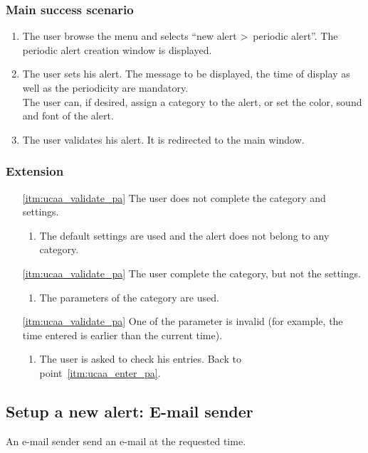 \subsubsection{Main success scenario}
\begin{enumerate}
	\item The user browse the menu and selects ``new alert \textgreater~periodic alert''. The periodic alert creation window is displayed. 
	\item\label{itm:ucaa_enter_pa} The user sets his alert. The message to be displayed, the time of display as well as the periodicity are mandatory. \\The user can, if desired, assign a category to the alert, or set the color, sound and font of the alert.
	\item\label{itm:ucaa_validate_pa} The user validates his alert. It is redirected to the main window.
\end{enumerate}
\subsubsection{Extension}
\begin{enumerate}
	\item[\ref{itm:ucaa_validate_pa}] The user does not complete the category and settings.
	\begin{enumerate}[i]
		\item The default settings are used and the alert does not belong to any category.
	\end{enumerate}
	\item[\ref{itm:ucaa_validate_pa}] The user complete the category, but not the settings.
	\begin{enumerate}[i]
		\item The parameters of the category are used.
	\end{enumerate}
	\item[\ref{itm:ucaa_validate_pa}] One of the parameter is invalid (for example, the time entered is earlier than the current time).
	\begin{enumerate}[i]
		\item The user is asked to check his entries. Back to point~\ref{itm:ucaa_enter_pa}.
	\end{enumerate}
\end{enumerate}

\subsection{Setup a new alert: E-mail sender}
An e-mail sender send an e-mail at the requested time.
